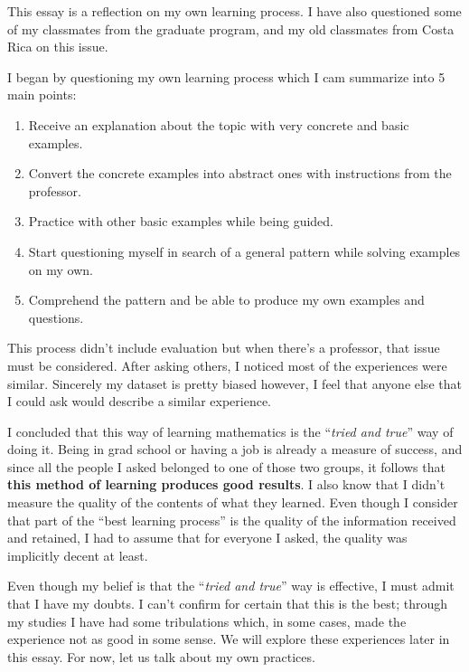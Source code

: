 \documentclass[a4paper,12pt,final]{book}
\begin{document}
 This essay is a reflection on my own learning process. I have also questioned some of my classmates from the graduate program, and my old classmates from Costa Rica on this issue.\par 
I began by questioning my own learning process which I cam summarize into 5 main points:
\begin{enumerate}
    \itemsep=-0.4em
    \item Receive an explanation about the topic with very concrete and basic examples. 
    \item Convert the concrete examples into abstract ones with instructions from the professor. 
    \item Practice with other basic examples while being guided.
    \item Start questioning myself in search of a general pattern while solving examples on my own.
    \item Comprehend the pattern and be able to produce my own examples and questions.
\end{enumerate}
This process didn't include evaluation but when there's a professor, that issue must be considered. After asking others, I noticed most of the experiences were similar. Sincerely my dataset is pretty biased however, I feel that anyone else that I could ask would describe a similar experience.\par 
I concluded that this way of learning mathematics is the ``\emph{tried and true}'' way of doing it. Being in grad school or having a job is already a measure of success, and since all the people I asked belonged to one of those two groups, it follows that \textbf{this method of learning produces good results}. I also know that I didn't measure the quality of the contents of what they learned. Even though I consider that part of the ``best learning process'' is the quality of the information received and retained, I had to assume that for everyone I asked, the quality was implicitly decent at least.\par 
Even though my belief is that the ``\emph{tried and true}'' way is effective, I must admit that I have my doubts. I can't confirm for certain that this is the best; through my studies I have had some tribulations which, in some cases, made the experience not as good in some sense. We will explore these experiences later in this essay. For now, let us talk about my own practices.\par 
\end{document}
